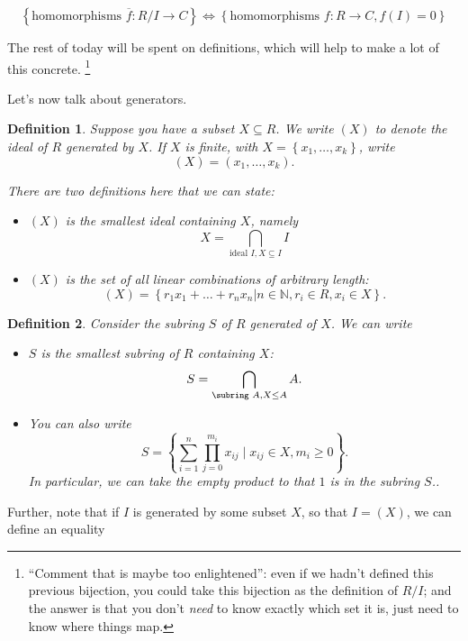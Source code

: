 \documentclass[12pt]{article}
\newtheorem*{definition}{Definition}
\newcommand{\NN}{\mathbb{N}}
\newcommand{\ol}{\overline}
\begin{document}
\[
  \left\{ \text{homomorphisms } \ol{f} : R / I \to C \right\} \Leftrightarrow \left\{ \text{homomorphisms } f: R \to C, f(I) = 0 \right\}
  \]

  The rest of today will be spent on definitions, which will help to make a lot of this concrete.  \footnote{``Comment that is maybe too enlightened'': even if we hadn't defined this previous bijection, you could take this bijection as the definition of $R/I$; and the answer is that you don't {\it need} to know exactly which set it is, just need to know where things map.}

  Let's now talk about generators.  \\

  \begin{definition}
    Suppose you have a subset $X \subseteq R$.  We write $(X)$ to denote the ideal of $R$ generated by $X$.  If $X$ is finite, with $X = \left\{ x_1, \dots, x_k \right\}$, write
    \[
      (X) = (x_1, \dots, x_k).
    \]

    There are two definitions here that we can state:
    \begin{itemize}
      \item $(X)$ is the smallest ideal containing $X$, namely
        \[
          X = \bigcap_{\text{ideal } I, X \subseteq I} I
          \]
      \item $(X)$ is the set of all linear combinations of arbitrary length:
        \[
          (X) = \left\{ r_1 x_1 + \dots + r_n x_n | n \in \NN, r_i \in R, x_i \in X \right\}.
        \]
    \end{itemize}
  \end{definition}

  \begin{definition}
    Consider the subring $S$ of $R$ generated of $X$.  We can write

    \begin{itemize}
      \item $S$ is the smallest subring of $R$ containing $X$:
        \[
          S = \bigcap_{\text{\subring } A, X \leq A} A.
        \]
      \item You can also write
        \[
          S = \left\{  \sum_{i=1}^{n} \prod_{j=0}^{m_i} x_{ij} \mid x_{ij} \in X, m_i \geq 0 \right\}.
        \]
        In particular, we can take the empty product to that $1$ is in the subring $S$..
    \end{itemize}
  \end{definition}


  Further, note that if $I$ is generated by some subset $X$, so that $I = (X)$, we can define an equality
\end{document}
